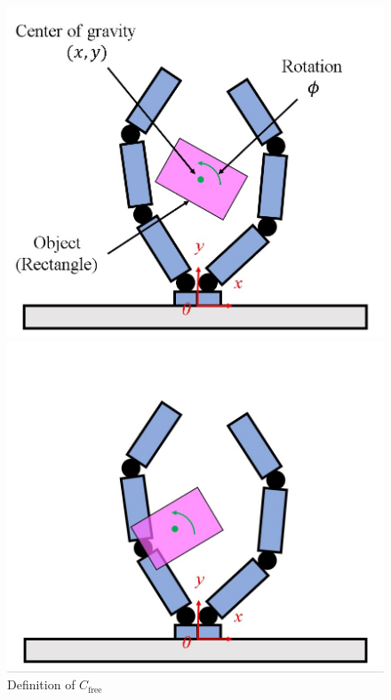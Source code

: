 \documentclass[a4paper,twoside,12pt,papersize, dvipdfmx]{iirthesis}
\begin{document}
\begin{figure}[b]
\begin{minipage}{0.5\hsize}
\centering
\includegraphics[width=0.9\hsize]{fig/Sensorless_ICM/define_cfree.jpg}
\end{minipage}
\begin{minipage}{0.5\hsize}
\centering
\includegraphics[width=0.9\hsize]{fig/Sensorless_ICM/define_notcfree.jpg}
\end{minipage}
\caption{Definition of $C_{\mathrm{free}}$}
\label{fig::sicm::cfree}
\end{figure}

\end{document}
